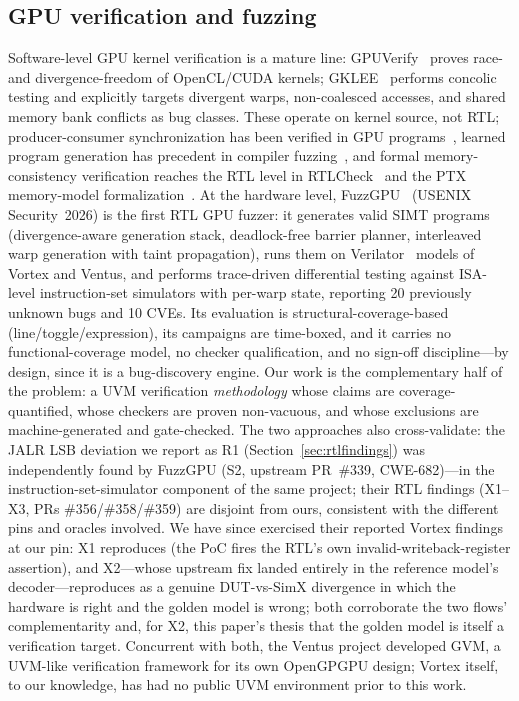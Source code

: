 \documentclass[conference]{IEEEtran}
\begin{document}
\subsection{GPU verification and fuzzing}
Software-level GPU kernel verification is a mature line:
GPUVerify~\cite{gpuverify} proves race- and divergence-freedom of
OpenCL/CUDA kernels; GKLEE~\cite{gklee} performs concolic testing and
explicitly targets divergent warps, non-coalesced accesses, and shared
memory bank conflicts as bug classes. These operate on kernel source,
not RTL; producer-consumer synchronization has been verified in GPU
programs~\cite{weft}, learned program generation has precedent in
compiler fuzzing~\cite{deepsmith}, and formal memory-consistency
verification reaches the RTL level in RTLCheck~\cite{rtlcheck} and the
PTX memory-model formalization~\cite{ptxmem}. At the hardware level, FuzzGPU~\cite{fuzzgpu} (USENIX
Security~2026) is the first RTL GPU fuzzer: it generates valid SIMT
programs (divergence-aware generation stack, deadlock-free barrier
planner, interleaved warp generation with taint propagation), runs them
on Verilator~\cite{verilator} models of Vortex and Ventus, and performs
trace-driven
differential testing against ISA-level instruction-set simulators with
per-warp state, reporting 20 previously unknown bugs and 10 CVEs. Its
evaluation is structural-coverage-based (line/toggle/expression), its
campaigns are time-boxed, and it carries no functional-coverage model,
no checker qualification, and no sign-off discipline---by design, since
it is a bug-discovery engine. Our work is the complementary half of the
problem: a UVM verification \emph{methodology} whose claims are
coverage-quantified, whose checkers are proven non-vacuous, and whose
exclusions are machine-generated and gate-checked. The two approaches
also cross-validate: the JALR LSB deviation we report as R1
(Section~\ref{sec:rtlfindings}) was independently found by FuzzGPU
(S2, upstream PR~\#339, CWE-682)---in the instruction-set-simulator
component of the same project; their RTL findings (X1--X3, PRs
\#356/\#358/\#359) are disjoint from ours, consistent with the
different pins and oracles involved. We have since exercised their
reported Vortex findings at our pin: X1 reproduces (the PoC fires the
RTL's own invalid-writeback-register assertion), and X2---whose
upstream fix landed entirely in the reference model's
decoder---reproduces as a genuine DUT-vs-SimX divergence in which the
hardware is right and the golden model is wrong; both corroborate the
two flows' complementarity and, for X2, this paper's thesis that the
golden model is itself a verification target. Concurrent with both,
the Ventus
project developed GVM, a UVM-like
verification framework for its own OpenGPGPU design;
Vortex itself, to our knowledge, has had no public UVM environment prior
to this work.
\end{document}
